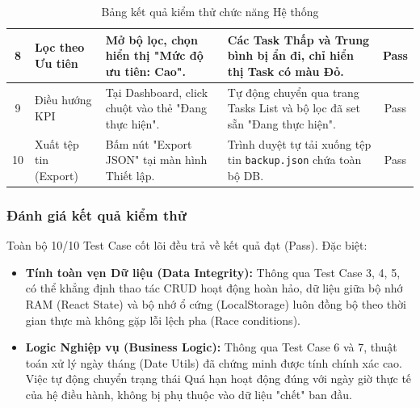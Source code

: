 \begin{table}[H]
\begin{tabular}{|c|p{3.0cm}|p{4.5cm}|p{4.5cm}|c|}
        \hline
        8 & Lọc theo Ưu tiên & Mở bộ lọc, chọn hiển thị "Mức độ ưu tiên: Cao". & Các Task Thấp và Trung bình bị ẩn đi, chỉ hiển thị Task có màu Đỏ. & Pass \\
        \hline
        9 & Điều hướng KPI & Tại Dashboard, click chuột vào thẻ "Đang thực hiện". & Tự động chuyển qua trang Tasks List và bộ lọc đã set sẵn "Đang thực hiện". & Pass \\
        \hline
        10 & Xuất tệp tin (Export) & Bấm nút "Export JSON" tại màn hình Thiết lập. & Trình duyệt tự tải xuống tệp tin \texttt{backup.json} chứa toàn bộ DB. & Pass \\
        \hline
    \end{tabular}
    \caption{Bảng kết quả kiểm thử chức năng Hệ thống}
\end{table}

\subsubsection{Đánh giá kết quả kiểm thử}
Toàn bộ 10/10 Test Case cốt lõi đều trả về kết quả đạt (Pass). Đặc biệt:
\begin{itemize}
    \item \textbf{Tính toàn vẹn Dữ liệu (Data Integrity):} Thông qua Test Case 3, 4, 5, có thể khẳng định thao tác CRUD hoạt động hoàn hảo, dữ liệu giữa bộ nhớ RAM (React State) và bộ nhớ ổ cứng (LocalStorage) luôn đồng bộ theo thời gian thực mà không gặp lỗi lệch pha (Race conditions).
    \item \textbf{Logic Nghiệp vụ (Business Logic):} Thông qua Test Case 6 và 7, thuật toán xử lý ngày tháng (Date Utils) đã chứng minh được tính chính xác cao. Việc tự động chuyển trạng thái Quá hạn hoạt động đúng với ngày giờ thực tế của hệ điều hành, không bị phụ thuộc vào dữ liệu "chết" ban đầu.
\end{itemize}
